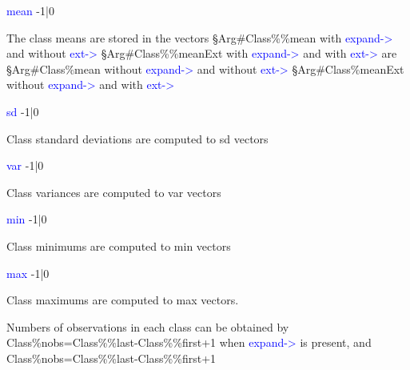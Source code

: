 \vspace{0.3cm}
\hline
\vspace{0.3cm}
\noindent \textcolor{blue}{mean} \tabto{3cm} -1|0 \tabto{5cm}    \tabto{7cm}
\begin{changemargin}{3cm}{0cm}
\noindent The class means are stored in the vectors \newline
§Arg\#Class\%\%mean with \textcolor{blue}{expand->} and without \textcolor{blue}{ext->}\newline
§Arg\#Class\%\%meanExt with \textcolor{blue}{expand->} and with \textcolor{blue}{ext->} are \newline
§Arg\#Class\%mean without \textcolor{blue}{expand->} and without \textcolor{blue}{ext->} \newline
§Arg\#Class\%meanExt without \textcolor{blue}{expand->} and with \textcolor{blue}{ext->}
\end{changemargin}
\vspace{0.3cm}
\hline
\vspace{0.3cm}
\noindent \textcolor{blue}{sd} \tabto{3cm} -1|0 \tabto{5cm}    \tabto{7cm}
\begin{changemargin}{3cm}{0cm}
\noindent  Class standard deviations are computed to sd vectors
\end{changemargin}
\vspace{0.3cm}
\hline
\vspace{0.3cm}
\noindent \textcolor{blue}{var} \tabto{3cm} -1|0 \tabto{5cm}    \tabto{7cm}
\begin{changemargin}{3cm}{0cm}
\noindent  Class variances are computed to var vectors
\end{changemargin}
\vspace{0.3cm}
\hline
\vspace{0.3cm}
\noindent \textcolor{blue}{min} \tabto{3cm} -1|0 \tabto{5cm}    \tabto{7cm}
\begin{changemargin}{3cm}{0cm}
\noindent  Class minimums are computed to min vectors
\end{changemargin}
\vspace{0.3cm}
\hline
\vspace{0.3cm}
\noindent \textcolor{blue}{max} \tabto{3cm} -1|0 \tabto{5cm}    \tabto{7cm}
\begin{changemargin}{3cm}{0cm}
\noindent  Class maximums are computed to max vectors.
\end {changemargin}
\hline
\vspace{0.2cm}
\begin{note}
Numbers of observations in each class can be obtained by \\
Class\%nobs=Class\%\%last-Class\%\%first+1 when \textcolor{blue}{expand->} is present, and \\
Class\%nobs=Class\%\%last-Class\%\%first+1
\end{note}
